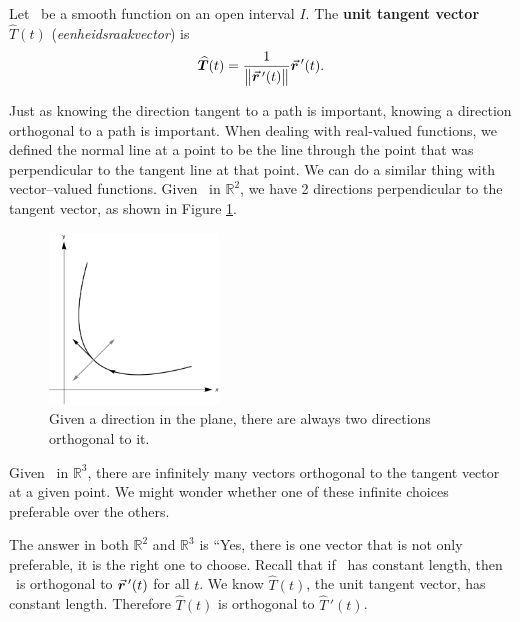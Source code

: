 \begin{definition}\label{def:unit_tangent}
Let \vrt\ be a smooth function on an open interval $I$. The \textbf{unit tangent vector $\widehat T(t)$} (\textit{eenheids\-raakvector}) is
 
$$\widehat T(t) = \frac{1}{\rule{0pt}{9pt}\norm{\vrp(t)}}\vrp(t).$$
\end{definition}

Just as knowing the direction tangent to a path is important, knowing a direction orthogonal to a path is important. When dealing with real-valued functions, we defined the normal line at a point to be the line through the point that was perpendicular to the tangent line at that point. We can do a similar thing with vector--valued functions. Given \vrt\ in $\mathbb{R}^2$, we have 2 directions perpendicular to the tangent vector, as shown in Figure \ref{fig_vector_fun_11}. 


\begin{figure}[H]
	\begin{center}
			\includegraphics[width=0.4\textwidth]{fig_vector_fun_11}
	\caption{Given a direction in the plane, there are always two directions orthogonal to it.}
	\label{fig_vector_fun_11}
	\end{center}
\end{figure}


Given \vrt\ in $\mathbb{R}^3$,  there are infinitely many vectors orthogonal to the tangent vector at a given point. We might wonder whether one of these infinite choices preferable over the others.

The answer in both $\mathbb{R}^2$ and $\mathbb{R}^3$ is ``Yes, there is one vector that is not only preferable, it is the right one to choose. Recall that if \vrt\ has constant length, then \vrt\ is orthogonal to $\vrp(t)$ for all $t$. We know $\widehat T(t)$, the unit tangent vector, has constant length. Therefore $\widehat T(t)$ is orthogonal to $\widehat T\,'(t)$.


